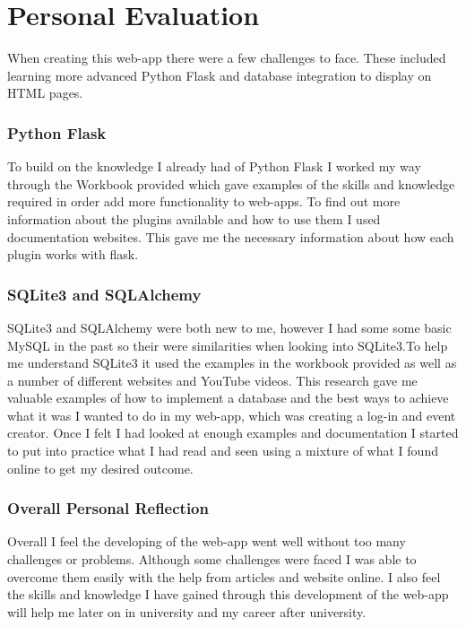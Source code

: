 \documentclass[10pt, a4paper]{article}
\begin{document}
    \section{Personal Evaluation}
    When creating this web-app there were a few challenges to face. These included learning more advanced Python Flask and database integration to display on HTML pages.

    \subsubsection{Python Flask}
    To build on the knowledge I already had of Python Flask I worked my way through the Workbook provided\cite{Wells} which gave examples of the skills and knowledge required in order add more functionality to web-apps. To find out more information about the plugins available and how to use them I used documentation websites\cite{SQLAlchemy}\cite{mail}\cite{wtfform}\cite{login}. This gave me the necessary information about how each plugin works with flask. 

    \subsubsection{SQLite3 and SQLAlchemy} 
    SQLite3 and SQLAlchemy were both new to me, however I had some some basic MySQL in the past so their were similarities when looking into SQLite3.To help me understand SQLite3 it used the examples in the workbook provided as well as a number of different websites\cite{SQLAlchemy} and YouTube videos. This research gave me valuable examples of how to implement a database and the best ways to achieve what it was I wanted to do in my web-app, which was creating a log-in and event creator. Once I felt I had looked at enough examples and documentation I started to put into practice what I had read and seen using a mixture of what I found online to get my desired outcome. 

    \newpage
    \subsubsection{Overall Personal Reflection}
    Overall I feel the developing of the web-app went well without too many challenges or problems. Although some challenges were faced I was able to overcome them easily with the help from articles and website online. I also feel the skills and knowledge I have gained through this development of the web-app will help me later on in university and my career after university.
    
    
    
		
\end{document}
